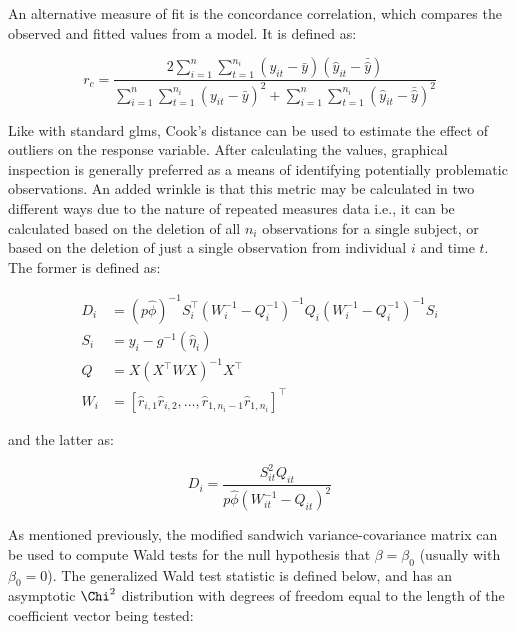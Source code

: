 \documentclass{report}
\begin{document}
An alternative measure of fit is the concordance correlation, which compares the observed and fitted values from a model. It is defined as:

\begin{equation}\label{eq:glm-gee-concordance-correlation}
    r_c = \frac{2 \sum_{i=1}^n \sum_{t=1}^{n_i} \left(y_{it} - \bar{y}\right)\left(\hat{y}_{it} - \bar{\hat{y}}\right)}{\sum_{i=1}^n \sum_{t=1}^{n_i} \left(y_{it} - \bar{y}\right)^2 + \sum_{i=1}^n \sum_{t=1}^{n_i} \left(\hat{y}_{it} - \bar{\hat{y}}\right)^2}
\end{equation}

Like with standard \glspl{glm}, Cook's distance can be used to estimate the effect of outliers on the response variable. After calculating the values, graphical inspection is generally preferred as a means of identifying potentially problematic observations. An added wrinkle is that this metric may be calculated in two different ways due to the nature of repeated measures data i.e., it can be calculated based on the deletion of all $n_i$ observations for a single subject, or based on the deletion of just a single observation from individual $i$ and time $t$. The former is defined as:

\begin{equation}\label{eq:glm-gee-cooks-distance-panel}
    \begin{aligned}
        D_i &= \left(p\hat{\phi}\right)^{-1} S_i^\intercal \left(W_i^{-1} -  Q_i^{-1}\right)^{-1} Q_i \left(W_i^{-1} - Q_i^{-1}\right)^{-1} S_i \\
        S_i &= y_i - g^{-1}\left(\hat{\eta}_i\right) \\
        Q &= X\left(X^\intercal W X\right)^{-1} X^\intercal \\
        W_i &= \left[\hat{r}_{i,1}\hat{r}_{i,2}, \dots, \hat{r}_{1, n_i-1}\hat{r}_{1,n_i}\right]^\intercal
    \end{aligned}
\end{equation}

and the latter as:

\begin{equation}\label{eq:glm-gee-cooks-distance-observation}
    D_i = \frac{S_{it}^2Q_{it}}{p\hat{\phi}\left(W_{it}^{-1} - Q_{it}\right)^2}
\end{equation}

As mentioned previously, the modified sandwich variance-covariance matrix can be used to compute Wald tests for the null hypothesis that $\beta = \beta_0$ (usually with $\beta_0 = 0$). The generalized Wald test statistic is defined below, and has an asymptotic $\Chi^2$ distribution with degrees of freedom equal to the length of the coefficient vector being tested:
\end{document}
